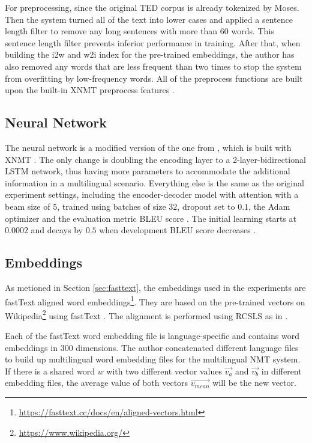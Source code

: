 \documentclass[thesis,fonts=libertine]{cluu}
\begin{document}
For preprocessing, since the original TED corpus is already tokenized by Moses. Then the system \cite{Neubig:2018aa} turned all of the text into lower cases and applied a sentence length filter to remove any long sentences with more than 60 words. This sentence length filter prevents inferior performance in training. After that, when building the i2w and w2i index for the pre-trained embeddings, the author has also removed any words that are less frequent than two times to stop the system from overfitting by low-frequency words. All of the preprocess functions are built upon the built-in XNMT preprocess features \parencite{Neubig:2018aa}.

\subsection{Neural Network}

The neural network is a modified version of the one from \cite{Qi:2018aa}, which is built with XNMT \cite{Neubig:2018aa}. The only change is doubling the encoding layer to a 2-layer-bidirectional LSTM network, thus having more parameters to accommodate the additional information in a multilingual scenario. Everything else is the same as the original experiment settings, including the encoder-decoder model with attention \parencite{Bahdanau:2014aa} with a beam size of $5$, trained using batches of size $32$, dropout set to $0.1$, the Adam optimizer \parencite{Kingma:2014aa} and the evaluation metric BLEU score \parencite{papineni-etal-2002-bleu}. The initial learning starts at $0.0002$ and decays by $0.5$ when development BLEU score decreases \parencite{Denkowski:2017aa}.

\subsection{Embeddings}

As metioned in Section \ref{sec:fasttext}, the embeddings used in the experiments are fastText aligned word embeddings\footnote{\url{https://fasttext.cc/docs/en/aligned-vectors.html}}. They are based on the pre-trained vectors on Wikipedia\footnote{\url{https://www.wikipedia.org/}} using fastText \parencite{Bojanowski:2016aa}. The alignment is performed using RCSLS as in \cite{Joulin:2018aa}.

Each of the fastText word embedding file is language-specific and contains word embeddings in 300 dimensions. The author concatenated different language files to build up multilingual word embedding files for the multilingual NMT system. If there is a shared word $w$ with two different vector values $\vec{v_a}$ and $\vec{v_b}$ in different embedding files, the average value of both vectors $\vec{v_{mean}}$ will be the new vector.
\end{document}
